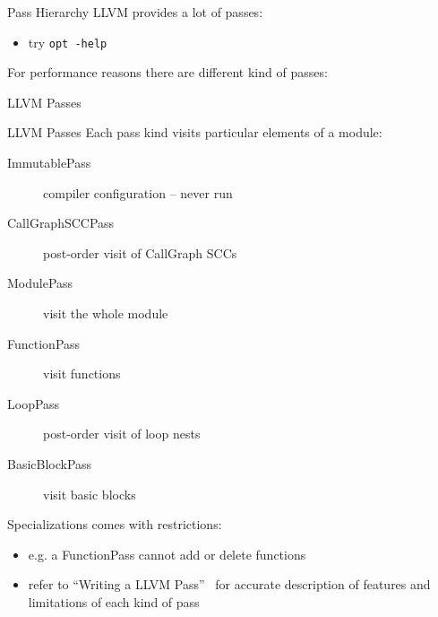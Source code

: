 \documentclass[10pt,mathserif]{beamer}
\begin{document}
\begin{frame}{Pass Hierarchy}
LLVM provides a lot of passes:

\begin{itemize}
\item try \texttt{\smaller opt -help}
\end{itemize}

\vfill
For performance reasons there are different kind of passes:

\begin{block}{LLVM Passes}

\centering
\end{block}
\end{frame}

\begin{frame}{LLVM Passes}
Each pass kind visits particular elements of a module:

\begin{description}
\item[ImmutablePass] compiler configuration -- never run
\item[CallGraphSCCPass] post-order visit of CallGraph SCCs
\item[ModulePass] visit the whole module
\item[FunctionPass] visit functions
\item[LoopPass] post-order visit of loop nests
\item[BasicBlockPass] visit basic blocks
\end{description}

\vfill
Specializations comes with restrictions:

\begin{itemize}
\item e.g. a \alert{FunctionPass} cannot add or delete functions
\item refer to ``Writing a LLVM Pass''~\cite{LOCAL:www/llvmWritingAPass}
      for accurate description of features and limitations of each kind of pass
\end{itemize}
\end{frame}

%
%
%
%
\end{document}
